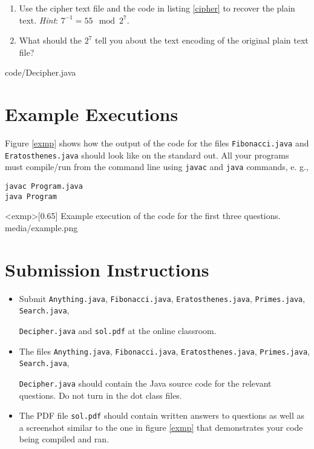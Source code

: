 \documentclass{homework}
\begin{document}
\begin{enumerate}
  \item Use the cipher text file and the code in listing \ref{cipher} to
        recover the plain text. \textit{Hint}: $7^{-1} = 55 \mod 2^7$.
  \item What should the $2^7$ tell you about the text encoding of the
        original plain text file?
\end{enumerate}


{code/Decipher.java}

\section{Example Executions}

Figure \ref{exmp} shows how the output of the code for the files
\texttt{Fibonacci.java} and \texttt{Eratosthenes.java} should look
like on the standard out. All your programs must compile/run from
the command line using \texttt{javac} and \texttt{java} commands,
e. g.,

\begin{verbatim}
javac Program.java
java Program
\end{verbatim}

\img<exmp>[0.65]
{Example execution of the code for the first three questions.} {media/example.png}

\section{Submission Instructions}

\begin{itemize}
  \item Submit \texttt{Anything.java}, \texttt{Fibonacci.java},
        \texttt{Eratosthenes.java}, \texttt{Primes.java},
        \texttt{Search.java},

        \noindent\texttt{Decipher.java} and
        \texttt{sol.pdf} at the online classroom.

  \item The files \texttt{Anything.java}, \texttt{Fibonacci.java},
        \texttt{Eratosthenes.java}, \texttt{Primes.java},
        \texttt{Search.java},

        \noindent\texttt{Decipher.java} should contain the
        Java source code for the relevant questions. Do not turn in the dot class files.

  \item The PDF file \texttt{sol.pdf} should contain written answers to
        questions as well as a screenshot similar to the one in figure \ref{exmp}
        that demonstrates your code being compiled and ran.
\end{itemize}
\end{document}
